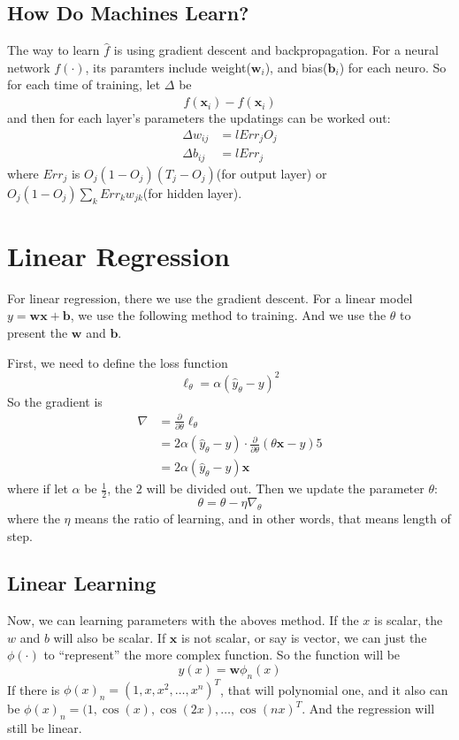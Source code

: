 \documentclass{article}
\begin{document}
\subsection{How Do Machines Learn?}
\label{sec:nn:how}

The way to learn $\hat{f}$ is using gradient descent and backpropagation.
For a neural network $f(\cdot)$, its paramters include weight($\mathbf{w}_i$),
and bias($\mathbf{b}_i$) for each neuro. So for each time of training, 
let $\Delta$ be
$$
 f(\mathbf{x}_i) - \hat{f}(\mathbf{x}_i)
$$
and then for each layer's parameters the updatings can be worked out:
\begin{align*}
  \Delta w_{ij} &= l{Err_jO_j} \\
  \Delta b_{ij} &= l{Err_j}
\end{align*}
where $Err_j$ is $O_j(1-O_j)(T_j-O_j)$(for output layer) or $O_j(1-O_j)\sum\limits_kErr_kw_{jk}$(for hidden layer).


\section{Linear Regression}
\label{sec:lreg}

For linear regression, there we use the gradient descent.
For a linear model $y=\mathbf{w}\mathbf{x}+\mathbf{b}$, we use the following method to training.
And we use the $\theta$ to present the $\mathbf{w}$ and $\mathbf{b}$.

First, we need  to define the loss function
\[
\ell_\theta = \alpha(\hat{y}_\theta - y)^2
\]
So the gradient is
\begin{align*}
\nabla &= \frac{\partial}{\partial \theta}\ell_\theta \\
       &= 2\alpha (\hat{y}_\theta -y)\cdot \frac{\partial}{\partial \theta}\left(\theta \mathbf{x} - y\right) 5 \\
       &= 2\alpha(\hat{y}_\theta -y)\mathbf{x}
\end{align*}
where if let $\alpha$ be $\frac{1}{2}$, the $2$ will be divided out.
Then we update the parameter $\theta$:
\[
\theta = \theta - \eta\nabla_\theta
\]
where the $\eta$ means the ratio of learning, and in other words, that means length of step.

\subsection{Linear Learning}
\label{sec:lreg:how}

Now, we can learning parameters with the aboves method.
If the $x$ is scalar, the $w$ and $b$ will also be scalar. If $\mathbf{x}$ is not scalar, or say is vector,
we can just the $\phi(\cdot)$ to ``represent'' the more complex function.
So the function will be 
\[
y(x) = \mathbf{w}\phi_n(x)
\]
If there is $\phi(x)_n = (1,x,x^2,\dots,x^n)^T$, that will polynomial one, and it also can be $\phi(x)_n = (1,\cos(x),\cos(2x),\dots,\cos(nx)^T$.
And the regression will still be linear.
\end{document}
